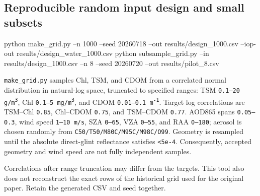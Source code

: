 \subsection{Reproducible random input design and small subsets}
\label{sec:auto:06_python_batch:7.6}

\begin{ManualCode}
python make_grid.py --n 1000 --seed 20260718 --out results/design_1000.csv --iop-out results/design_water_1000.csv
python subsample_grid.py --in results/design_1000.csv --n 8 --seed 20260720 --out results/pilot_8.csv
\end{ManualCode}

\texttt{make\_\allowbreak{}grid.\allowbreak{}py} samples Chl, TSM, and CDOM from a correlated normal distribution in natural-log space, truncated to specified ranges: TSM \texttt{0.\allowbreak{}1--20 g/\allowbreak{}m\textsuperscript{3}}, Chl \texttt{0.\allowbreak{}1--5 mg/\allowbreak{}m\textsuperscript{3}}, and CDOM \texttt{0.\allowbreak{}01--0.\allowbreak{}1 m\textsuperscript{-}\textsuperscript{1}}. Target log correlations are TSM--Chl \texttt{0.\allowbreak{}85}, Chl--CDOM \texttt{0.\allowbreak{}75}, and TSM--CDOM \texttt{0.\allowbreak{}77}. AOD865 spans \texttt{0.\allowbreak{}05--0.\allowbreak{}3}, wind speed \texttt{1--10 m/\allowbreak{}s}, SZA \texttt{0--65\textdegree{}}, VZA \texttt{0--55\textdegree{}}, and RAA \texttt{0--180\textdegree{}}; aerosol is chosen randomly from \texttt{C50/\allowbreak{}T50/\allowbreak{}M80C/\allowbreak{}M95C/\allowbreak{}M98C/\allowbreak{}O99}. Geometry is resampled until the absolute direct-glint reflectance satisfies \texttt{<5e-\allowbreak{}4}. Consequently, accepted geometry and wind speed are not fully independent samples.

Correlations after range truncation may differ from the targets. This tool also does not reconstruct the exact rows of the historical grid used for the original paper. Retain the generated CSV and seed together.



